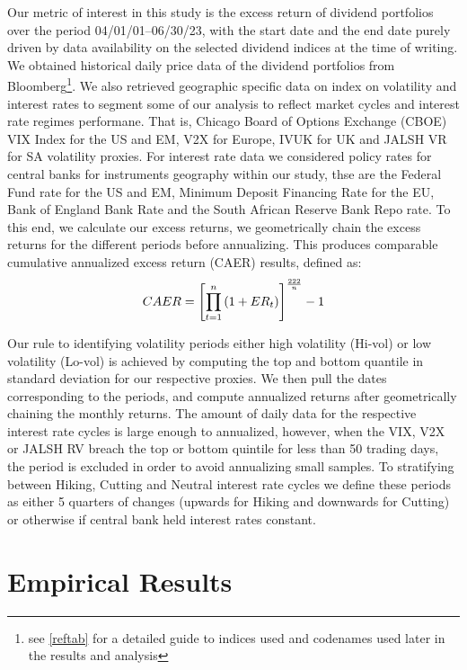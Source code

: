 \documentclass[12pt,preprint, authoryear]{elsarticle}
\numberwithin{equation}{section}
\numberwithin{figure}{section}
\numberwithin{table}{section}
\let\rmarkdownfootnote\footnote%
\def\footnote{\protect\rmarkdownfootnote}
\begin{document}
Our metric of interest in this study is the excess return of dividend
portfolios over the period 04/01/01--06/30/23, with the start date and
the end date purely driven by data availability on the selected dividend
indices at the time of writing. We obtained historical daily price data
of the dividend portfolios from Bloomberg\footnote{see \ref{reftab} for
  a detailed guide to indices used and codenames used later in the
  results and analysis}. We also retrieved geographic specific data on
index on volatility and interest rates to segment some of our analysis
to reflect market cycles and interest rate regimes performane. That is,
Chicago Board of Options Exchange (CBOE) VIX Index for the US and EM,
V2X for Europe, IVUK for UK and JALSH VR for SA volatility proxies. For
interest rate data we considered policy rates for central banks for
instruments geography within our study, thse are the Federal Fund rate
for the US and EM, Minimum Deposit Financing Rate for the EU, Bank of
England Bank Rate and the South African Reserve Bank Repo rate. To this
end, we calculate our excess returns, we geometrically chain the excess
returns for the different periods before annualizing. This produces
comparable cumulative annualized excess return (CAER) results, defined
as: \begin{align}
C A E R=\left[\prod_{t=1}^n\left(1+E R_t\right)\right]^{\frac{222}{n}}-1 \notag
\end{align}

Our rule to identifying volatility periods either high volatility
(Hi-vol) or low volatility (Lo-vol) is achieved by computing the top and
bottom quantile in standard deviation for our respective proxies. We
then pull the dates corresponding to the periods, and compute annualized
returns after geometrically chaining the monthly returns. The amount of
daily data for the respective interest rate cycles is large enough to
annualized, however, when the VIX, V2X or JALSH RV breach the top or
bottom quintile for less than 50 trading days, the period is excluded in
order to avoid annualizing small samples. To stratifying between Hiking,
Cutting and Neutral interest rate cycles we define these periods as
either 5 quarters of changes (upwards for Hiking and downwards for
Cutting) or otherwise if central bank held interest rates constant.

\newpage

\hypertarget{empirical-results}{%
\section{Empirical Results}\label{empirical-results}}
\end{document}
